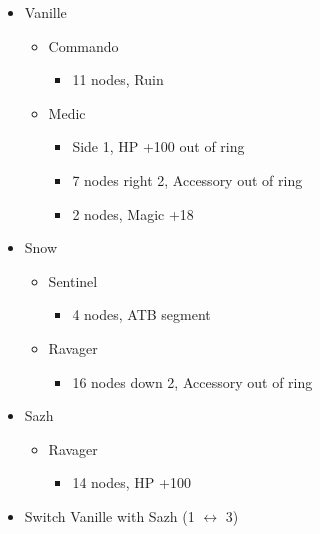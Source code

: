 \begin{menu}
\begin{multicols}{2}
\begin{itemize}
    \crystarium
    \begin{itemize}
        \item Vanille
        \begin{itemize}
            \item Commando
            \begin{itemize}
                \item 11 nodes, Ruin
            \end{itemize}
            \item Medic
            \begin{itemize}
                \item Side 1, HP +100 out of ring
                \item 7 nodes right 2, Accessory out of ring
                \item 2 nodes, Magic +18
            \end{itemize}
        \end{itemize}
        \item Snow
        \begin{itemize}
            \item Sentinel
            \begin{itemize}
                \item 4 nodes, ATB segment
            \end{itemize}
            \item Ravager
            \begin{itemize}
                \item 16 nodes down 2, Accessory out of ring
            \end{itemize}
        \end{itemize}
        \item Sazh
        \begin{itemize}
            \item Ravager
            \begin{itemize}
                \item 14 nodes,  HP +100
            \end{itemize}
        \end{itemize}
    \end{itemize}
    \columnbreak
    \paradigm
    \begin{itemize}
        \item Switch Vanille with Sazh (1 $\leftrightarrow$ 3)

\end{itemize}
\end{itemize}
\end{multicols}
\end{menu}
